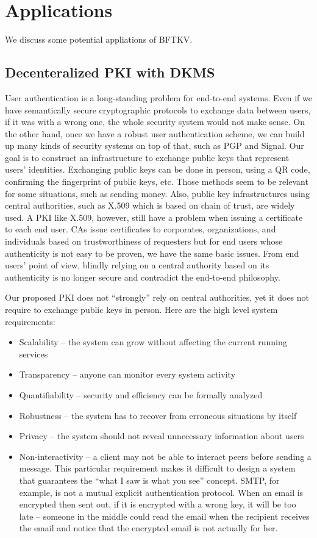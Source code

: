\section{Applications}
We discuss some potential appliations of BFTKV.

\subsection{Decenteralized PKI with DKMS}

User authentication is a long-standing problem for end-to-end
systems. Even if we have semantically secure cryptographic protocols
to exchange data between users, if it was with a wrong one, the whole
security system would not make sense. On the other hand, once we have
a robust user authentication scheme, we can build up many kinds of
security systems on top of that, such as PGP and Signal. Our goal is
to construct an infrastructure to exchange public keys that represent
users' identities. Exchanging public keys can be done in person,
using a QR code, confirming the fingerprint of public keys, etc. Those
methods seem to be relevant for some situations, such as sending
money. Also, public key infrastructures using central authorities,
such as X.509 which is based on chain of trust, are widely used. A PKI
like X.509, however, still have a problem when issuing a certificate
to each end user. CAs issue certificates to corporates, organizations,
and individuals based on trustworthiness of requesters but for end
users whose authenticity is not easy to be proven, we have the same
basic issues. From end users' point of view, blindly relying on a
central authority based on its authenticity is no longer secure and
contradict the end-to-end philosophy.

Our proposed PKI does not ``strongly'' rely on central authorities,
yet it does not require to exchange public keys in person. Here are
the high level system requirements:
\begin{itemize}
\item Scalability -- the system can grow without affecting the current running services
\item Transparency -- anyone can monitor every system activity
\item Quantifiability -- security and efficiency can be formally analyzed
\item Robustness -- the system has to recover from erroneous situations by itself
\item Privacy -- the system should not reveal unnecessary information about users
\item Non-interactivity -- a client may not be able to interact peers
before sending a message. This particular requirement makes it
difficult to design a system that guarantees the ``what I saw is what
you see'' concept. SMTP, for example, is not a mutual explicit
authentication protocol. When an email is encrypted then sent out, if
it is encrypted with a wrong key, it will be too late -- someone in
the middle could read the email when the recipient receives the email
and notice that the encrypted email is not actually for her.
\end{itemize}

